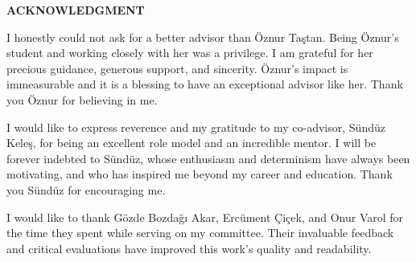 \clearpage
\setlength{\parindent}{0pt}
\begin{center}
	\MakeUppercase{\textbf{acknowledgment}} \\ [3\baselineskip]
\end{center}

I honestly could not ask for a better advisor than Öznur Taştan.
Being Öznur's student and working closely with her was a privilege.
I am grateful for her precious guidance, generous support, and sincerity.
Öznur's impact is immeasurable and it is a blessing to have an exceptional advisor like her.
Thank you Öznur for believing in me.

I would like to express reverence and my gratitude to my co-advisor, Sündüz Keleş, for being an excellent role model and an incredible mentor.
I will be forever indebted to Sündüz, whose enthusiasm and determinism have always been motivating, and who has inspired me beyond my career and education.
Thank you Sündüz for encouraging me.


I would like to thank Gözde Bozdağı Akar, Ercüment Çiçek, and Onur Varol for the time they spent while serving on my committee. Their invaluable feedback and critical evaluations have improved this work's quality and readability.



